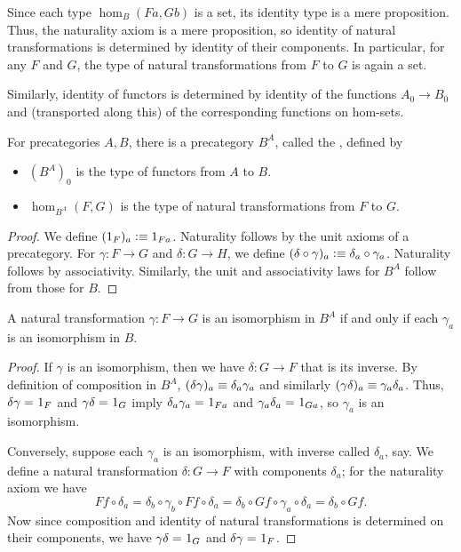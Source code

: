 Since each type $\hom_B(Fa,Gb)$ is a set, its identity type is a mere proposition.
Thus, the naturality axiom is a mere proposition, so identity of natural transformations is determined by identity of their components.
In particular, for any $F$ and $G$, the type of natural transformations from $F$ to $G$ is again a set.

Similarly, identity of functors is determined by identity of the functions $A_0\to B_0$ and (transported along this) of the corresponding functions on hom-sets.

\begin{defn}\label{ct:functor-precat}
  For precategories $A,B$, there is a precategory $B^A$, called the , defined by
  \begin{itemize}
  \item $(B^A)_0$ is the type of functors from $A$ to $B$.
  \item $\hom_{B^A}(F,G)$ is the type of natural transformations from $F$ to $G$.
  \end{itemize}
\end{defn}
\begin{proof}
  We define $(1_F)_a\vcentcolon\equiv 1_{Fa}$.
  Naturality follows by the unit axioms of a precategory.
  For $\gamma:F\to G$ and $\delta:G\to H$, we define $(\delta\circ\gamma)_a\vcentcolon\equiv \delta_a\circ \gamma_a$.
  Naturality follows by associativity.
  Similarly, the unit and associativity laws for $B^A$ follow from those for $B$.
\end{proof}

\begin{lem}\label{ct:natiso}
  A natural transformation $\gamma:F\to G$ is an isomorphism in $B^A$ if and only if each $\gamma_a$ is an isomorphism in $B$.
\end{lem}
\begin{proof}
  If $\gamma$ is an isomorphism, then we have $\delta:G\to F$ that is its inverse.
  By definition of composition in $B^A$, $(\delta\gamma)_a\equiv \delta_a\gamma_a$ and similarly $(\gamma\delta)_a\equiv \gamma_a\delta_a$.
  Thus, $\delta\gamma =_{} 1_F$ and $\gamma\delta =_{} 1_G$ imply $\delta_a\gamma_a =_{} 1_{Fa}$ and $\gamma_a\delta_a =_{} 1_{Ga}$, so $\gamma_a$ is an isomorphism.

  Conversely, suppose each $\gamma_a$ is an isomorphism, with inverse called $\delta_a$, say.
We define a natural transformation $\delta:G\to F$ with components $\delta_a$; for the naturality axiom we have
  \[ Ff\circ \delta_a = \delta_b\circ \gamma_b\circ Ff \circ \delta_a = \delta_b\circ Gf\circ \gamma_a\circ \delta_a = \delta_b\circ Gf. \]
  Now since composition and identity of natural transformations is determined on their components, we have $\gamma\delta =_{} 1_G$ and $\delta\gamma =_{} 1_F$.
\end{proof}

